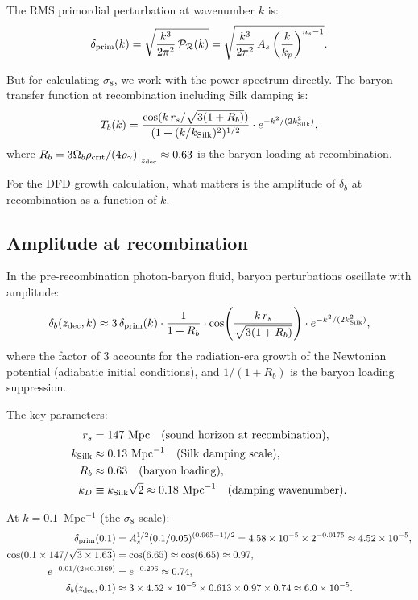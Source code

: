 \documentclass[11pt]{article}
\newcommand{\ee}[1]{\times 10^{#1}}
\newcommand{\kSilk}{k_{\rm Silk}}
\newcommand{\Ob}{\Omega_b}
\begin{document}
The RMS primordial perturbation at wavenumber $k$ is:
\begin{equation}
\delta_{\rm prim}(k) = \sqrt{\frac{k^3}{2\pi^2}\,\mathcal{P}_\mathcal{R}(k)}
= \sqrt{\frac{k^3}{2\pi^2}\,A_s\left(\frac{k}{k_p}\right)^{n_s-1}}.
\end{equation}

But for calculating $\sigma_8$, we work with the power spectrum directly.
The baryon transfer function at recombination including Silk damping is:
\begin{equation}
T_b(k) = \frac{\cos(k\,r_s/\sqrt{3(1+R_b)})}{(1 + (k/\kSilk)^2)^{1/2}}
\cdot e^{-k^2/(2\kSilk^2)},
\label{eq:Tb}
\end{equation}
where $R_b = 3\Ob\rho_{\rm crit}/(4\rho_\gamma)\big|_{z_{\rm dec}}
\approx 0.63$ is the baryon loading at recombination.

For the DFD growth calculation, what matters is the amplitude of
$\delta_b$ at recombination as a function of $k$.

\subsection{Amplitude at recombination}

In the pre-recombination photon-baryon fluid, baryon perturbations
oscillate with amplitude:
\begin{equation}
\delta_b(z_{\rm dec}, k) \approx
3\,\delta_{\rm prim}(k)\cdot\frac{1}{1+R_b}\cdot
\cos\!\left(\frac{k\,r_s}{\sqrt{3(1+R_b)}}\right)
\cdot e^{-k^2/(2\kSilk^2)},
\label{eq:delta-dec}
\end{equation}
where the factor of 3 accounts for the radiation-era growth of the
Newtonian potential (adiabatic initial conditions), and $1/(1+R_b)$
is the baryon loading suppression.

The key parameters:
\begin{align}
r_s &= 147\text{ Mpc} \quad\text{(sound horizon at recombination)}, \\
\kSilk &\approx 0.13\text{ Mpc}^{-1} \quad\text{(Silk damping scale)}, \\
R_b &\approx 0.63 \quad\text{(baryon loading)}, \\
k_D &\equiv \kSilk\sqrt{2} \approx 0.18\text{ Mpc}^{-1}
  \quad\text{(damping wavenumber)}.
\end{align}

At $k = 0.1$~Mpc$^{-1}$ (the $\sigma_8$ scale):
\begin{align}
\delta_{\rm prim}(0.1) &= A_s^{1/2}(0.1/0.05)^{(0.965-1)/2}
= 4.58\ee{-5}\times 2^{-0.0175}
\approx 4.52\ee{-5}, \\
\cos(0.1\times 147/\sqrt{3\times 1.63}) &= \cos(6.65)
\approx \cos(6.65) \approx 0.97, \\
e^{-0.01/(2\times 0.0169)} &= e^{-0.296} \approx 0.74, \\
\delta_b(z_{\rm dec}, 0.1) &\approx 3\times 4.52\ee{-5}\times 0.613
\times 0.97\times 0.74 \approx 6.0\ee{-5}.
\end{align}
\end{document}

